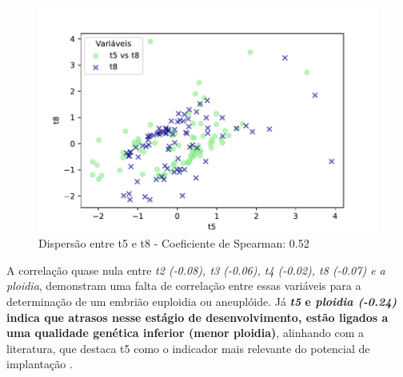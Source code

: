 \begin{figure}[h]
\begin{minipage}[b]{0.45\linewidth}
        \caption{Dispersão entre t5 e t8 - Coeficiente de Spearman: 0.52}
        \label{fig:t5-t8}
        \centering
        \includegraphics[scale=0.48]{figuras/Spearman/t5-t8.pdf}
        \vspace{0.3cm}
        \begin{minipage}{\linewidth}
            \centering
        \end{minipage}
    \end{minipage}
\end{figure}
\FloatBarrier

A correlação quase nula entre \textit{t2 (-0.08), t3 (-0.06), t4 (-0.02), t8 (-0.07) e a ploidia}, demonstram uma falta de correlação entre essas variáveis para a determinação de um embrião euploidia ou aneuplóide. Já \textbf{\textit{t5} e \textit{ploidia (-0.24)} indica que atrasos nesse estágio de desenvolvimento, estão ligados a uma qualidade genética inferior (menor ploidia)}, alinhando com a literatura, que destaca t5 como o indicador mais relevante do potencial de implantação . 

